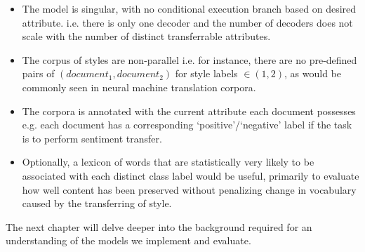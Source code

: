 \begin{itemize}
	\item The model is singular, with no conditional execution branch based on desired attribute. i.e. there is only one decoder and the number of decoders does not scale with the number of distinct transferrable attributes.
	\item The corpus of styles are non-parallel i.e. for instance, there are no pre-defined pairs of $(document_1, document_2)$ for style labels $\in (1, 2)$, as would be commonly seen in neural machine translation corpora.
	\item The corpora is annotated with the current attribute each document possesses e.g. each document has a corresponding `positive'/`negative' label if the task is to perform sentiment transfer.
	\item Optionally, a lexicon of words that are statistically very likely to be associated with each distinct class label would be useful, primarily to evaluate how well content has been preserved without penalizing change in vocabulary caused by the transferring of style.
\end{itemize}

The next chapter will delve deeper into the background required for an understanding of the models we implement and evaluate.
